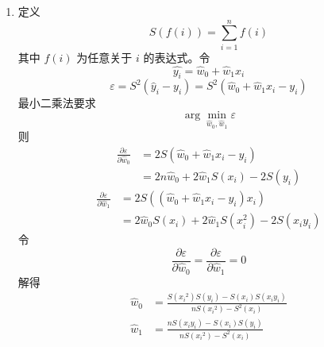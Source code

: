 \documentclass[11pt,letter,notitlepage]{article}
\begin{document}
\begin{solution}
	\begin{enumerate}
		\item 定义
		      $$S(f(i))=\sum_{i=1}^{n}{f(i)}$$
		      其中 $f(i)$ 为任意关于 $i$ 的表达式。令
		      $$\hat{y_i} = \hat{w}_0+\hat{w}_1 x_i$$
		      $$\varepsilon = S^2(\hat{y}_i-y_i)
			      = S^2(\hat{w}_0+\hat{w}_1 x_i-y_i)$$
		      最小二乘法要求
		      $$\arg\min_{\hat{w}_0,\hat{w}_1} \varepsilon$$
		      则
		      $$\begin{aligned}
				      \frac{\partial\varepsilon}{\partial \hat{w}_0}
				       & = 2 S(\hat{w}_0+\hat{w}_1 x_i-y_i)           \\
				       & = 2n\hat{w}_0 + 2\hat{w}_1 S(x_i) - 2 S(y_i)
			      \end{aligned}$$
		      $$\begin{aligned}
				      \frac{\partial\varepsilon}{\partial \hat{w}_1}
				       & = 2 S((\hat{w}_0+\hat{w}_1 x_i-y_i)x_i)                   \\
				       & = 2\hat{w}_0 S(x_i) + 2 \hat{w}_1 S(x_i^2) - 2 S(x_i y_i)
			      \end{aligned}$$
		      令
		      $$\frac{\partial\varepsilon}{\partial \hat{w}_0} = \frac{\partial\varepsilon}{\partial \hat{w}_1} = 0$$
		      解得
		      $$\begin{aligned}
				      \hat{w}_0 & = \frac
				      {S({x_i}^2) S(y_i) - S(x_i) S(x_i y_i)}
				      {n S({x_i}^2) - S^2(x_i)} \\
				      \hat{w}_1 & = \frac
				      {n S(x_i y_i) - S(x_i) S(y_i)}
				      {n S({x_i}^2) - S^2(x_i)}
			      \end{aligned}$$


\end{enumerate}
\end{solution}
\end{document}
